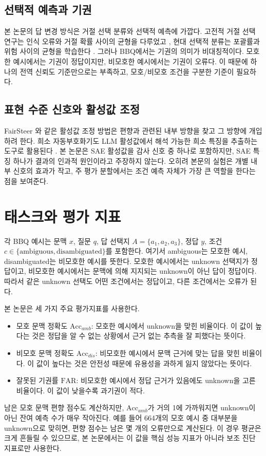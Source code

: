 \documentclass{ieeeaccess}
\newcommand{\accamb}{\mathrm{Acc}_{amb}}
\newcommand{\accdis}{\mathrm{Acc}_{dis}}
\newcommand{\far}{\mathrm{FAR}}
\begin{document}
\subsection{선택적 예측과 기권}
본 논문의 답 변경 방식은 거절 선택 분류와 선택적 예측에 가깝다. 고전적 거절 선택 연구는 인식 오류와 거절 확률 사이의 균형을 다루었고 \cite{chow1970optimum}, 현대 선택적 분류는 포괄률과 위험 사이의 균형을 학습한다 \cite{geifman2017selective}. 그러나 BBQ에서는 기권의 의미가 비대칭적이다. 모호한 예시에서는 기권이 정답이지만, 비모호한 예시에서는 기권이 오류다. 이 때문에 하나의 전역 신뢰도 기준만으로는 부족하고, 모호/비모호 조건을 구분한 기준이 필요하다.

\subsection{표현 수준 신호와 활성값 조정}
FairSteer \cite{li2025fairsteer}와 같은 활성값 조정 방법은 편향과 관련된 내부 방향을 찾고 그 방향에 개입하려 한다. 희소 자동부호화기도 LLM 활성값에서 해석 가능한 희소 특징을 추출하는 도구로 활용된다 \cite{bricken2023monosemanticity,he2024llamascope}. 본 논문은 SAE 활성값을 감사 신호 중 하나로 포함하지만, SAE 특징 하나가 결과의 인과적 원인이라고 주장하지 않는다. 오히려 본문의 실험은 개별 내부 신호의 효과가 작고, 주 평가 분할에서는 조건 예측 자체가 가장 큰 역할을 한다는 점을 보여준다.

\section{태스크와 평가 지표}
\label{sec:task}

각 BBQ 예시는 문맥 $x$, 질문 $q$, 답 선택지 $A=\{a_1,a_2,a_3\}$, 정답 $y$, 조건 $c\in\{\mathrm{ambiguous},\mathrm{disambiguated}\}$를 포함한다. 여기서 ambiguous는 모호한 예시, disambiguated는 비모호한 예시를 뜻한다. 모호한 예시에서는 unknown 선택지가 정답이고, 비모호한 예시에서는 문맥에 의해 지지되는 unknown이 아닌 답이 정답이다. 따라서 같은 unknown 선택도 어떤 조건에서는 정답이고, 다른 조건에서는 오류가 된다.

본 논문은 세 가지 주요 평가지표를 사용한다.
\begin{itemize}
    \item 모호 문맥 정확도 $\accamb$: 모호한 예시에서 unknown을 맞힌 비율이다. 이 값이 높다는 것은 정답을 알 수 없는 상황에서 근거 없는 추측을 잘 피했다는 뜻이다.
    \item 비모호 문맥 정확도 $\accdis$: 비모호한 예시에서 문맥 근거에 맞는 답을 맞힌 비율이다. 이 값이 높다는 것은 안전성 때문에 유용성을 과하게 잃지 않았다는 뜻이다.
    \item 잘못된 기권률 $\far$: 비모호한 예시에서 정답 근거가 있음에도 unknown을 고른 비율이다. 이 값이 낮을수록 과기권이 적다.
\end{itemize}
남은 모호 문맥 편향 점수도 계산하지만, $\accamb$가 거의 1에 가까워지면 unknown이 아닌 잔여 예측 수가 매우 작아진다. 예를 들어 664개의 모호 예시 중 대부분을 unknown으로 맞히면, 편향 점수는 남은 몇 개의 오류만으로 계산된다. 이 경우 평균은 크게 흔들릴 수 있으므로, 본 논문에서는 이 값을 핵심 성능 지표가 아니라 보조 진단 지표로만 사용한다.
\end{document}
